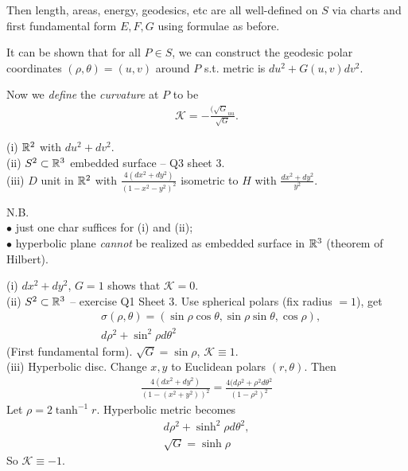 \documentclass[a4paper]{article}
\begin{document}
Then length, areas, energy, geodesics, etc are all well-defined on $S$ via charts and first fundamental form $E,F,G$ using formulae as before.

It can be shown that for all $P \in S$, we can construct the geodesic polar coordinates $(\rho,\theta) = (u,v)$ around $P$ s.t. metric is $du^2 + G(u,v) dv^2$.

Now we \emph{define} the \emph{curvature} at $P$ to be
\begin{equation*}
\begin{aligned}
\mathcal{K} = -\frac{(\sqrt{G}_{uu}}{\sqrt{G}}.
\end{aligned}
\end{equation*}

\begin{eg}
(i) $\mathbb{R}^2$ with $du^2+dv^2$.\\
(ii) $S^2 \subset \mathbb{R}^3$ embedded surface -- Q3 sheet 3.\\
(iii) $D$ unit in $\mathbb{R}^2$ with $\frac{4(dx^2+dy^2)}{(1-x^2-y^2)^2}$ isometric to $H$ with $\frac{dx^2 + dy^2}{y^2}$.

N.B. \\
$\bullet$ just one char suffices for (i) and (ii);\\
$\bullet$ hyperbolic plane \emph{cannot} be realized as embedded surface in $\mathbb{R}^3$ (theorem of Hilbert).

(i) $dx^2+dy^2$, $G=1$ shows that $\mathcal{K} = 0$.\\
(ii) $S^2 \subset \mathbb{R}^3$ -- exercise Q1 Sheet 3. Use spherical polars (fix radius $=1$), get
\begin{equation*}
\begin{aligned}
& \sigma(\rho,\theta) = (\sin \rho \cos \theta, \sin \rho \sin \theta, \cos \rho),\\
& d\rho^2 + \sin^2 \rho d \theta^2
\end{aligned}
\end{equation*}
(First fundamental form). $\sqrt{G} = \sin \rho$, $\mathcal{K} \equiv 1$.\\
(iii) Hyperbolic disc. Change $x,y$ to Euclidean polars $(r,\theta)$. Then
\begin{equation*}
\begin{aligned}
\frac{4(dx^2+dy^2)}{(1-(x^2+y^2))^2} = \frac{4(d\rho^2 + \rho^2 d\theta^2}{(1-\rho^2)^2}
\end{aligned}
\end{equation*}
Let $\rho=2\tanh^{-1} r$. Hyperbolic metric becomes
\begin{equation*}
\begin{aligned}
d\rho^2 + \sinh^2 \rho d\theta^2,\\
\sqrt{G} = \sinh \rho
\end{aligned}
\end{equation*}
So $\mathcal{K} \equiv -1$.
\end{eg}
\end{document}
